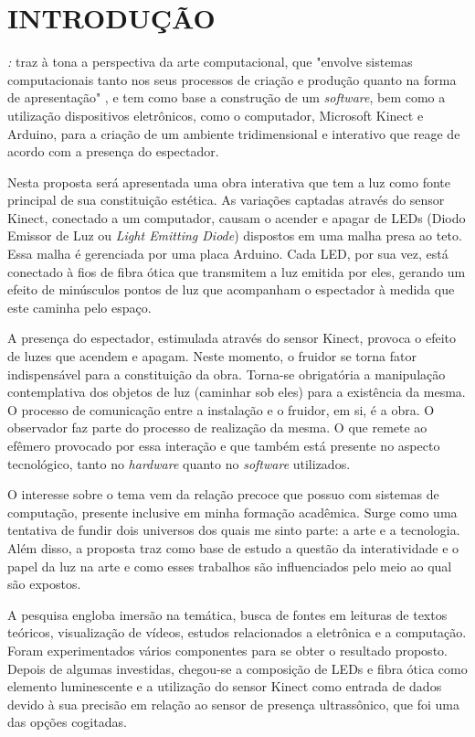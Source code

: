 %
%

\chapter{INTRODUÇÃO}\label{chap:introducao}

\textit{{\imprimirtitulotb}: {\imprimirsubtitulo}} traz à tona a perspectiva da arte computacional, que "envolve sistemas computacionais tanto nos seus processos de criação e produção quanto na forma de apresentação" \cite[p. 36]{boone}, e tem como base a construção de um \textit{software}, bem como a utilização dispositivos eletrônicos, como o computador, Microsoft Kinect e Arduino, para a criação de um ambiente tridimensional e interativo que reage de acordo com a presença do espectador.

Nesta proposta será apresentada uma obra interativa que tem a luz como fonte principal de sua constituição estética. As variações captadas através do sensor Kinect, conectado a um computador, causam o acender e apagar de LEDs (Diodo Emissor de Luz ou \textit{Light Emitting Diode}) dispostos em uma malha presa ao teto. Essa malha é gerenciada por uma placa Arduino. Cada LED, por sua vez, está conectado à fios de fibra ótica que transmitem a luz emitida por eles, gerando um efeito de minúsculos pontos de luz que acompanham o espectador à medida que este caminha pelo espaço.

A presença do espectador, estimulada através do sensor Kinect, provoca o efeito de luzes que acendem e apagam. Neste momento, o fruidor se torna fator indispensável para a constituição da obra. Torna-se obrigatória a manipulação contemplativa dos objetos de luz  (caminhar sob eles) para a existência da mesma. O processo de comunicação entre a instalação e o fruidor, em si, é a obra. O observador faz parte do processo de realização da mesma. O que remete ao efêmero provocado por essa interação e que também está presente no aspecto tecnológico, tanto no \textit{hardware} quanto no \textit{software} utilizados. 

O interesse sobre o tema vem da relação precoce que possuo com sistemas de computação, presente inclusive em minha formação acadêmica. Surge como uma tentativa de fundir dois universos dos quais me sinto parte: a arte e a tecnologia. Além disso, a proposta traz como base de estudo a questão da interatividade e o papel da luz na arte e como esses trabalhos são influenciados pelo meio ao qual são expostos.

A pesquisa engloba imersão na temática, busca de fontes em leituras de textos teóricos, visualização de vídeos, estudos relacionados a eletrônica e a computação. Foram experimentados vários componentes para se obter o resultado proposto. Depois de algumas investidas, chegou-se a composição de LEDs e fibra ótica como elemento luminescente e a utilização do sensor Kinect como entrada de dados devido à sua precisão em relação ao sensor de presença ultrassônico, que foi uma das opções cogitadas.